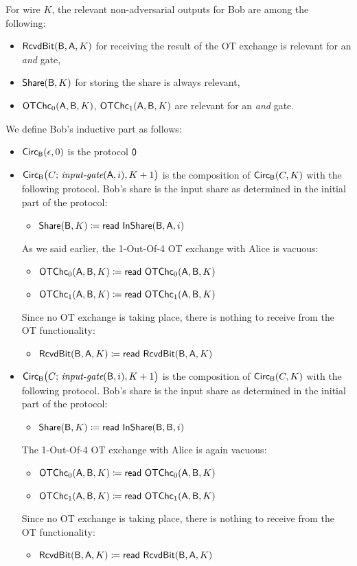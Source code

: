 \noindent For wire $K$, the relevant non-adversarial outputs for Bob are among the following:
\begin{itemize}
\item $\mathsf{RcvdBit}(\mathsf{B},\mathsf{A},K)$ for receiving the result of the OT exchange is relevant for an \emph{and} gate,
\item $\mathsf{Share}(\mathsf{B},K)$ for storing the share is always relevant,
\item $\mathsf{OTChc}_0(\mathsf{A},\mathsf{B},K)$, $\mathsf{OTChc}_1(\mathsf{A},\mathsf{B},K)$ are relevant for an \emph{and} gate.
\end{itemize}

\noindent We define Bob's inductive part as follows:

\begin{itemize}
\item $\mathsf{Circ}_{\mathsf{B}}(\epsilon,0)$ is the protocol $\mathsf{0}$

\item $\mathsf{Circ}_{\mathsf{B}}\big(C; \, \textit{input-gate}(\mathsf{A},i),K+1\big)$ is the composition of $\mathsf{Circ}_{\mathsf{B}}(C,K)$ with the following protocol. Bob’s share is the input share as determined in the initial part of the protocol:
\begin{itemize}
\item $\mathsf{Share}(\mathsf{B},K) \coloneqq \mathsf{read} \ \mathsf{InShare}(\mathsf{B},\mathsf{A},i)$
\end{itemize}
As we said earlier, the 1-Out-Of-4 OT exchange with Alice is vacuous:
\begin{itemize}
\item $\mathsf{OTChc}_0(\mathsf{A},\mathsf{B},K) \coloneqq \mathsf{read} \ \mathsf{OTChc}_0(\mathsf{A},\mathsf{B},K)$
\item $\mathsf{OTChc}_1(\mathsf{A},\mathsf{B},K) \coloneqq \mathsf{read} \ \mathsf{OTChc}_1(\mathsf{A},\mathsf{B},K)$
\end{itemize}
Since no OT exchange is taking place, there is nothing to receive from the OT functionality:
\begin{itemize}
\item $\mathsf{RcvdBit}(\mathsf{B},\mathsf{A},K) \coloneqq \mathsf{read} \ \mathsf{RcvdBit}(\mathsf{B},\mathsf{A},K)$
\end{itemize}

\item $\mathsf{Circ}_{\mathsf{B}}\big(C; \, \textit{input-gate}(\mathsf{B},i),K+1\big)$ is the composition of $\mathsf{Circ}_{\mathsf{B}}(C,K)$ with the following protocol. Bob’s share is the input share as determined in the initial part of the protocol:
\begin{itemize}
\item $\mathsf{Share}(\mathsf{B},K) \coloneqq \mathsf{read} \ \mathsf{InShare}(\mathsf{B},\mathsf{B},i)$
\end{itemize}
The 1-Out-Of-4 OT exchange with Alice is again vacuous:
\begin{itemize}
\item $\mathsf{OTChc}_0(\mathsf{A},\mathsf{B},K) \coloneqq \mathsf{read} \ \mathsf{OTChc}_0(\mathsf{A},\mathsf{B},K)$
\item $\mathsf{OTChc}_1(\mathsf{A},\mathsf{B},K) \coloneqq \mathsf{read} \ \mathsf{OTChc}_1(\mathsf{A},\mathsf{B},K)$
\end{itemize}
Since no OT exchange is taking place, there is nothing to receive from the OT functionality:
\begin{itemize}
\item $\mathsf{RcvdBit}(\mathsf{B},\mathsf{A},K) \coloneqq \mathsf{read} \ \mathsf{RcvdBit}(\mathsf{B},\mathsf{A},K)$
\end{itemize}


\end{itemize}
